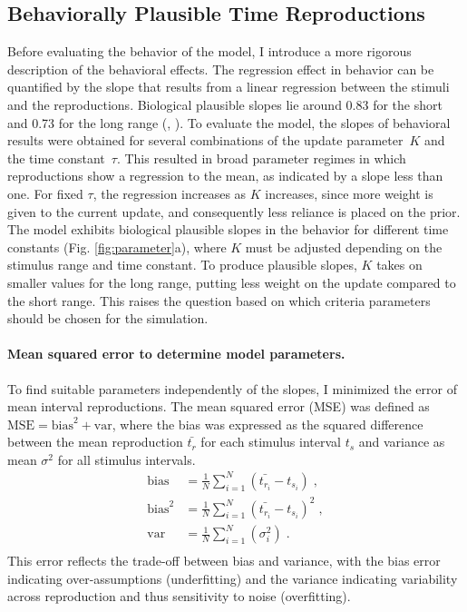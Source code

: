 \documentclass[10pt]{article}
\begin{document}
\subsection{Behaviorally Plausible Time Reproductions}
Before evaluating the behavior of the model, I introduce a more rigorous description of the behavioral effects. 
The regression effect in behavior can be quantified by the slope that results from a linear regression between the stimuli and the reproductions.
Biological plausible slopes lie around 0.83 for the short and 0.73 for the long range (\cite{Sohn2019}, \cite{Henke2021}). 
To evaluate the model, the slopes of behavioral results were obtained for several combinations of the update parameter~$K$ and the time constant~$\tau$.
This resulted in broad parameter regimes in which reproductions show a regression to the mean, as indicated by a slope less than one. 
For fixed $\tau$, the regression increases as $K$ increases, since more weight is given to the current update, and consequently less reliance is placed on the prior. 
The model exhibits biological plausible slopes in the behavior for different time constants (Fig. \ref{fig:parameter}a), where $K$ must be adjusted depending on the stimulus range and time constant. 
To produce plausible slopes, $K$ takes on smaller values for the long range, putting less weight on the update compared to the short range.
This raises the question based on which criteria parameters should be chosen for the simulation.

\paragraph{Mean squared error to determine model parameters.}
To find suitable parameters independently of the slopes, I minimized the error of mean interval reproductions. The mean squared error (MSE) was defined as $\text{MSE} = \text{bias}^2+\text{var}$, where the bias was expressed as the squared difference between the mean reproduction $\bar{t_{r}}$ for each stimulus interval $t_s$ and variance as mean $\sigma^2$ for all stimulus intervals.
\begin{equation} \label{MSE}
	\begin{split}
	 \text{bias} & = \frac{1}{N} \sum \limits_{i=1}^{N} (\bar{t_{r_i}} - t_{s_i}) \;,\\
	 \text{bias}^2 & = \frac{1}{N} \sum \limits_{i=1}^{N}(\bar{t_{r_i}} - t_{s_i})^2 \;,\\
	 \text{var} & = \frac{1}{N} \sum \limits_{i=1}^{N}(\sigma_i^2) \;.\\
	\end{split}
\end{equation}
This error reflects the trade-off between bias and variance, with the bias error indicating over-assumptions (underfitting) and the variance indicating variability across reproduction and thus sensitivity to noise (overfitting).
\end{document}
